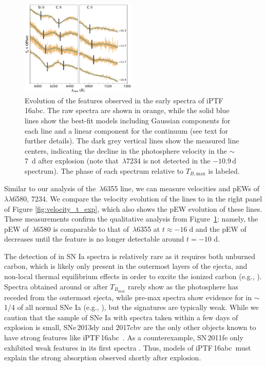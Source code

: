 \documentclass[twocolumn]{aastex61}
\newcommand{\abc}{iPTF\,16abc}
\begin{document}
\begin{figure}[]
  \centering
  \includegraphics[width=0.49\textwidth]{CarbonFeature.pdf}
  \caption{Evolution of the  features observed in the 
  early spectra of \abc. The raw spectra are shown in orange, while 
  the solid blue lines show the best-fit models including Gaussian 
  components for each line and a linear component for the continuum 
  (see text for further details). The dark grey vertical lines show 
  the measured line centers, indicating the decline in the 
  photosphere velocity in the $\sim$7~d after explosion (note that 
  \,$\lambda$7234 is not detected in the $-10.9$\,d 
  spectrum). The phase of each spectrum relative to 
  $T_{B,\mathrm{max}}$ is labeled.
  }
  \label{fig:carbon}
\end{figure}

Similar to our analysis of the \,$\lambda$6355 line, we 
can measure velocities and pEWs of 
\,$\lambda\lambda$6580, 7234. We compare the velocity 
evolution of the  lines to  in the right panel 
of Figure \ref{fig:velocity_t_exp}, which also shows the pEW evolution of these lines. These measurements confirm the qualitative analysis from Figure~\ref{fig:carbon}: namely, the pEW of \,$\lambda$6580 is comparable to that
of \,$\lambda$6355 at $t \approx -16 \; \mathrm{d}$ and 
the pEW of  
decreases until the feature is no longer detectable 
around $t = -10$ d.

The detection of  in SN Ia spectra is relatively rare
as it requires both unburned carbon, which is likely only present in the outermost layers of the ejecta, and non-local thermal equilibrium effects in order to excite the ionized carbon (e.g., \citealt{2007ApJ...654L..53T}). Spectra obtained around or after $T_{B_\mathrm{max}}$ rarely show  as the photosphere has receded from the outermost ejecta, while pre-max spectra show evidence for  in $\sim$1/4 of all normal SNe Ia (e.g., \citealt{2011ApJ...732...30P,2012MNRAS.425.1917S,2011ApJ...743...27T}), but the signatures are typically weak. While we caution that the sample of SNe Ia with spectra taken within a few days of explosion is small, SNe\,2013dy and 2017cbv are the only other objects known to have strong  features like \abc\ \citep{2013ApJ...778L..15Z,2017arXiv170608990H}. As a counterexample, SN\,2011fe only exhibited weak  features in its first spectra
\citep{2012ApJ...752L..26P}. Thus, models of \abc\ must explain the strong  absorption observed shortly after explosion.
\end{document}
